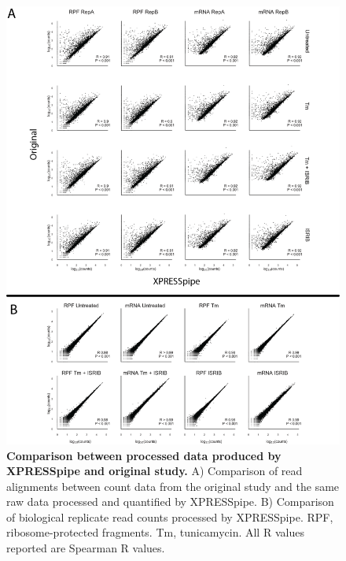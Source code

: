 \documentclass[10pt, oneside]{article}
\begin{document}
\begin{figure}
\centering
  \includegraphics[width=160mm]{figures/xpresspipe_figure2.png}
  \caption{\textbf{Comparison between processed data produced by XPRESSpipe and original study.} A) Comparison of read alignments between count data from the original study and the same raw data processed and quantified by XPRESSpipe. B) Comparison of biological replicate read counts processed by XPRESSpipe. RPF, ribosome-protected fragments. Tm, tunicamycin. All R values reported are Spearman R values.}
  \label{fig:figure2}
\end{figure}
\end{document}
